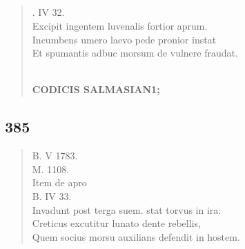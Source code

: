 \documentclass[11pt, a4paper]{report}
\begin{document}
            \subsection*{}
      \begin{verse}
      . IV 32. \\ Excipit ingentem luvenalis fortior aprum. \\ Incumbens umero laevo pede pronior instat \\ Et spumantis adbuc morsum de vulnere fraudat. \\ 
        ﻿\pagebreak 
     \marginpar{[295]} \begin{center} \textbf{CODICIS SALMASIAN1;} \end{center}
      \end{verse}
  
            \subsection*{385}
      \begin{verse}
      B. V 1783. \\ M. 1108. \\ Item de apro \\ B. IV 33. \\ Invadunt post terga suem. stat torvus in ira: \\ Creticus excutitur lunato dente rebellis, \\ Quem socius morsu auxilians defendit in hostem. \\ 
      \end{verse}
  
\end{document}
